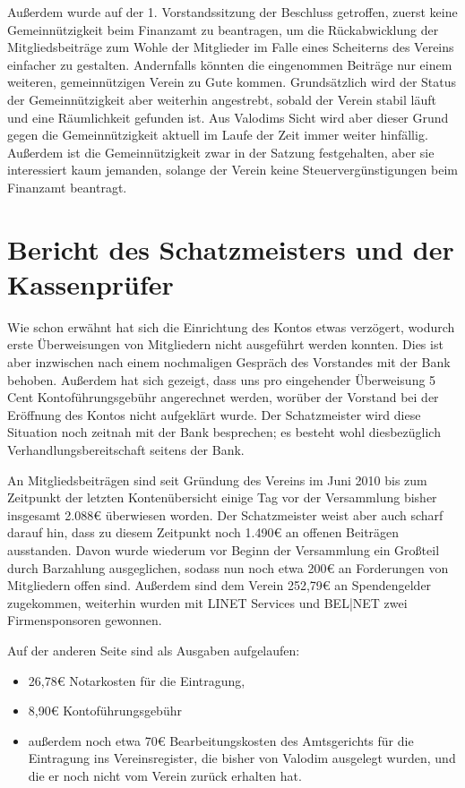 \documentclass[a4paper,12pt]{scrartcl}
\begin{document}
Außerdem wurde auf der 1. Vorstandssitzung der Beschluss getroffen, zuerst keine
Gemeinnützigkeit beim Finanzamt zu beantragen, um die Rückabwicklung der
Mitgliedsbeiträge zum Wohle der Mitglieder im Falle eines Scheiterns des
Vereins einfacher zu gestalten. Andernfalls könnten die eingenommen Beiträge nur
einem weiteren, gemeinnützigen Verein zu Gute kommen. Grundsätzlich wird der
Status der Gemeinnützigkeit aber weiterhin angestrebt, sobald der Verein stabil
läuft und eine Räumlichkeit gefunden ist. Aus Valodims Sicht wird aber dieser
Grund gegen die Gemeinnützigkeit aktuell im Laufe der Zeit immer weiter
hinfällig. Außerdem ist die Gemeinnützigkeit zwar in der Satzung festgehalten,
aber sie interessiert kaum jemanden, solange der Verein keine
Steuervergünstigungen beim Finanzamt beantragt.

\section{Bericht des Schatzmeisters und der Kassenprüfer}
Wie schon erwähnt hat sich die Einrichtung des Kontos etwas verzögert, wodurch
erste Überweisungen von Mitgliedern nicht ausgeführt werden konnten. Dies ist
aber inzwischen nach einem nochmaligen Gespräch des Vorstandes mit der Bank
behoben. Außerdem hat sich gezeigt, dass uns pro eingehender Überweisung 5 Cent
Kontoführungsgebühr angerechnet werden, worüber der Vorstand bei der Eröffnung
des Kontos nicht aufgeklärt wurde. Der Schatzmeister wird diese Situation noch
zeitnah mit der Bank besprechen; es besteht wohl diesbezüglich
Verhandlungsbereitschaft seitens der Bank.

An Mitgliedsbeiträgen sind seit Gründung des Vereins im Juni 2010 bis zum
Zeitpunkt der letzten Kontenübersicht einige Tag vor der Versammlung bisher
insgesamt 2.088€ überwiesen worden. Der Schatzmeister weist aber auch scharf
darauf hin, dass zu diesem Zeitpunkt noch 1.490€ an offenen Beiträgen
ausstanden. Davon wurde wiederum vor Beginn der Versammlung ein Großteil durch
Barzahlung ausgeglichen, sodass nun noch etwa 200€ an Forderungen von
Mitgliedern offen sind. Außerdem sind dem Verein 252{,}79€ an Spendengelder
zugekommen, weiterhin wurden mit LINET Services und BEL|NET zwei Firmensponsoren
gewonnen.

Auf der anderen Seite sind als Ausgaben aufgelaufen:
\begin{itemize}
  \item 26{,}78€ Notarkosten für die Eintragung,
  \item 8{,}90€ Kontoführungsgebühr
  \item außerdem noch etwa 70€ Bearbeitungskosten des Amtsgerichts für die
    Eintragung ins Vereinsregister, die bisher von Valodim ausgelegt wurden, und
    die er noch nicht vom Verein zurück erhalten hat.
\end{itemize}
\end{document}
